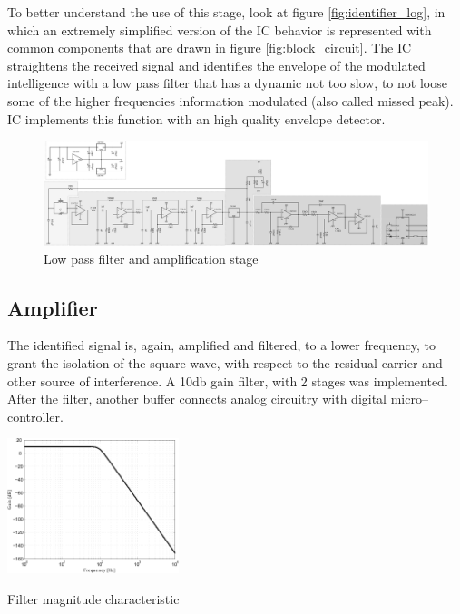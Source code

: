 To better understand the use of this stage, look at figure \ref{fig:identifier_log}, in which an extremely simplified version of the IC behavior is represented with common components that are drawn in figure \ref{fig:block_circuit}. The IC straightens the received signal and identifies the envelope of the modulated intelligence with a low pass filter that has a dynamic not too slow, to not loose some of the higher frequencies information modulated (also called missed peak). IC implements this function with an high quality envelope detector.
\begin{figure}[h]
	\centering
	\includegraphics*[viewport=1443 3 2320 350,scale=0.4]{ch2/img/receiver3.pdf}
	\caption{Low pass filter and amplification stage}
	\label{fig:filter2}
	\forcerectofloat
\end{figure}

\subsection{Amplifier}

The identified signal is, again, amplified and filtered, to a lower frequency, to grant the isolation of the square wave, with respect to the residual carrier and other source of interference. A \num{10}\si{\decibel} gain filter, with 2 stages was implemented. After the filter, another buffer connects analog circuitry with digital micro--controller.
\begin{marginfigure}[5cm]
	\centering
	\includegraphics[width=5cm]{ch2/img/filter2.pdf}
	\caption{Filter magnitude characteristic}
\end{marginfigure}

